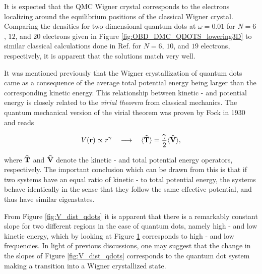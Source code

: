 \begin{figure}[h]
\begin{center}
  \label{fig:E_dist_qdots}
 \end{center}
\end{figure}

It is expected that the QMC Wigner crystal corresponds to the electrons localizing around the equilibrium positions of the classical Wigner crystal\cite{WignerTransport}. Comparing the densities for two-dimensional quantum dots at $\omega=0.01$ for $N=6$, $12$, and $20$ electrons given in Figure \ref{fig:OBD_DMC_QDOTS_lowering3D} to similar classical calculations done in Ref. \cite{WignerClassic} for $N=6$, $10$, and $19$ electrons, respectively, it is apparent that the solutions match very well.  

It was mentioned previously that the Wigner crystallization of quantum dots came as a consequence of the average total potential energy being larger than the corresponding kinetic energy. This relationship between kinetic - and potential energy is closely related to the \textit{virial theorem} from classical mechanics. The quantum mechanical version of the virial theorem was proven by Fock in 1930 \cite{FockVirial} and reads

\begin{equation}
 V(\mathbf{r}) \propto r^\gamma \quad\longrightarrow\quad \langle {\bf\widehat{T}} \rangle = \frac{\gamma}{2} \langle {\bf\widehat{V}} \rangle, \label{eq:virial}
\end{equation}

where ${\bf\widehat{T}}$ and ${\bf\widehat{V}}$ denote the kinetic - and total potential energy operators, respectively. The important conclusion which can be drawn from this is that if two systems have an equal ratio of kinetic - to total potential energy, the systems behave identically in the sense that they follow the same effective potential, and thus have similar eigenstates. 

From Figure \ref{fig:V_dist_qdots} it is apparent that there is a remarkably constant slope for two different regions in the case of quantum dots, namely high - and low kinetic energy, which by looking at Figure \ref{fig:E_dist_qdots} corresponds to high - and low frequencies. In light of previous discussions, one may suggest that the change in the slopes
of Figure \ref{fig:V_dist_qdots} corresponds to the quantum dot system  making a transition into a Wigner crystallized state.



\newpage

